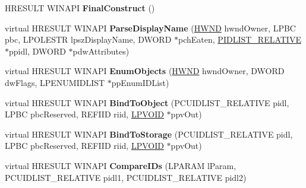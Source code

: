 \begin{DoxyCompactItemize}
\item 
\mbox{\label{class_c_desktop_folder_a1d7a222e44af0ec9f8784564adec9778}} 
H\+R\+E\+S\+U\+LT W\+I\+N\+A\+PI {\bfseries Final\+Construct} ()
\item 
\mbox{\label{class_c_desktop_folder_a1e069da5b41f16ad78c622171921ed54}} 
virtual H\+R\+E\+S\+U\+LT W\+I\+N\+A\+PI {\bfseries Parse\+Display\+Name} (\hyperlink{interfacevoid}{H\+W\+ND} hwnd\+Owner, L\+P\+BC pbc, L\+P\+O\+L\+E\+S\+TR lpsz\+Display\+Name, D\+W\+O\+RD $\ast$pch\+Eaten, \hyperlink{struct___i_t_e_m_i_d_l_i_s_t___r_e_l_a_t_i_v_e}{P\+I\+D\+L\+I\+S\+T\+\_\+\+R\+E\+L\+A\+T\+I\+VE} $\ast$ppidl, D\+W\+O\+RD $\ast$pdw\+Attributes)
\item 
\mbox{\label{class_c_desktop_folder_a02d5f31ae29fcb9da75942251134a1b2}} 
virtual H\+R\+E\+S\+U\+LT W\+I\+N\+A\+PI {\bfseries Enum\+Objects} (\hyperlink{interfacevoid}{H\+W\+ND} hwnd\+Owner, D\+W\+O\+RD dw\+Flags, L\+P\+E\+N\+U\+M\+I\+D\+L\+I\+ST $\ast$pp\+Enum\+I\+D\+List)
\item 
\mbox{\label{class_c_desktop_folder_a0e6951ad2fa155867c53eb49f1ea4ea9}} 
virtual H\+R\+E\+S\+U\+LT W\+I\+N\+A\+PI {\bfseries Bind\+To\+Object} (P\+C\+U\+I\+D\+L\+I\+S\+T\+\_\+\+R\+E\+L\+A\+T\+I\+VE pidl, L\+P\+BC pbc\+Reserved, R\+E\+F\+I\+ID riid, \hyperlink{interfacevoid}{L\+P\+V\+O\+ID} $\ast$ppv\+Out)
\item 
\mbox{\label{class_c_desktop_folder_a00444c136bfed153b53f87844a567969}} 
virtual H\+R\+E\+S\+U\+LT W\+I\+N\+A\+PI {\bfseries Bind\+To\+Storage} (P\+C\+U\+I\+D\+L\+I\+S\+T\+\_\+\+R\+E\+L\+A\+T\+I\+VE pidl, L\+P\+BC pbc\+Reserved, R\+E\+F\+I\+ID riid, \hyperlink{interfacevoid}{L\+P\+V\+O\+ID} $\ast$ppv\+Out)
\item 
\mbox{\label{class_c_desktop_folder_a8763edc713368bbe980979e2c6520ad9}} 
virtual H\+R\+E\+S\+U\+LT W\+I\+N\+A\+PI {\bfseries Compare\+I\+Ds} (L\+P\+A\+R\+AM l\+Param, P\+C\+U\+I\+D\+L\+I\+S\+T\+\_\+\+R\+E\+L\+A\+T\+I\+VE pidl1, P\+C\+U\+I\+D\+L\+I\+S\+T\+\_\+\+R\+E\+L\+A\+T\+I\+VE pidl2)
\item 
\mbox{\label{class_c_desktop_folder_a1c4f92dbd13a26b39a184fe12c4c6b36}} 

\end{DoxyCompactItemize}
